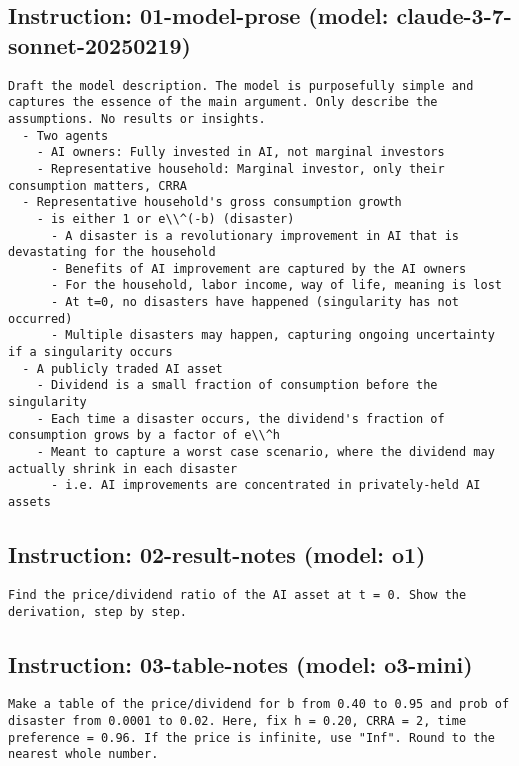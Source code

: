 \subsection*{Instruction: 01-model-prose  (model: claude-3-7-sonnet-20250219)}
\vspace{-1ex}
\begin{lstlisting}[language=text,breaklines=true,frame=single]
Draft the model description. The model is purposefully simple and captures the essence of the main argument. Only describe the assumptions. No results or insights.
  - Two agents
    - AI owners: Fully invested in AI, not marginal investors
    - Representative household: Marginal investor, only their consumption matters, CRRA
  - Representative household's gross consumption growth
    - is either 1 or e\\^(-b) (disaster)
      - A disaster is a revolutionary improvement in AI that is devastating for the household
      - Benefits of AI improvement are captured by the AI owners
      - For the household, labor income, way of life, meaning is lost 
      - At t=0, no disasters have happened (singularity has not occurred)
      - Multiple disasters may happen, capturing ongoing uncertainty if a singularity occurs
  - A publicly traded AI asset
    - Dividend is a small fraction of consumption before the singularity
    - Each time a disaster occurs, the dividend's fraction of consumption grows by a factor of e\\^h
    - Meant to capture a worst case scenario, where the dividend may actually shrink in each disaster
      - i.e. AI improvements are concentrated in privately-held AI assets

\end{lstlisting}
\vspace{-3ex}
\subsection*{Instruction: 02-result-notes  (model: o1)}
\vspace{-1ex}
\begin{lstlisting}[language=text,breaklines=true,frame=single]
Find the price/dividend ratio of the AI asset at t = 0. Show the derivation, step by step.

\end{lstlisting}
\vspace{-3ex}
\subsection*{Instruction: 03-table-notes  (model: o3-mini)}
\vspace{-1ex}
\begin{lstlisting}[language=text,breaklines=true,frame=single]
Make a table of the price/dividend for b from 0.40 to 0.95 and prob of disaster from 0.0001 to 0.02. Here, fix h = 0.20, CRRA = 2, time preference = 0.96. If the price is infinite, use "Inf". Round to the nearest whole number.

\end{lstlisting}
\vspace{-3ex}
